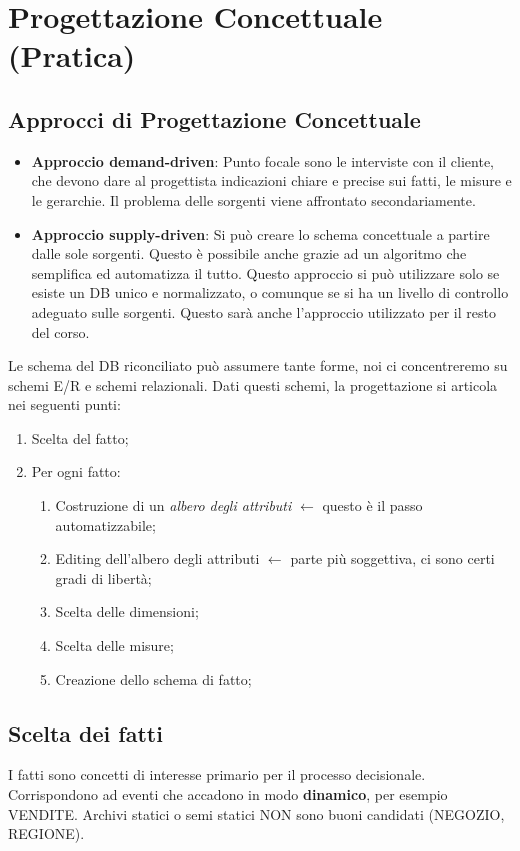 \section{Progettazione Concettuale (Pratica)}
\subsection{Approcci di Progettazione Concettuale}
\begin{itemize}
	\item \textbf{Approccio demand-driven}: Punto focale sono le interviste con il cliente, che devono dare al progettista indicazioni chiare e precise sui fatti, le misure e le gerarchie. Il problema delle sorgenti viene affrontato secondariamente.
	\item \textbf{Approccio supply-driven}: Si può creare lo schema concettuale a partire dalle sole sorgenti. Questo è possibile anche grazie ad un algoritmo che semplifica ed automatizza il tutto. Questo approccio si può utilizzare solo se esiste un DB unico e normalizzato, o comunque se si ha un livello di controllo adeguato sulle sorgenti. Questo sarà anche l'approccio utilizzato per il resto del corso.
\end{itemize}
Le schema del DB riconciliato può assumere tante forme, noi ci concentreremo su schemi E/R e schemi relazionali. Dati questi schemi, la progettazione si articola nei seguenti punti:
\begin{enumerate}
	\item Scelta del fatto;
	\item Per ogni fatto:
	\begin{enumerate}
		\item Costruzione di un \textit{albero degli attributi} $\xleftarrow{}$ questo è il passo automatizzabile;
		\item Editing dell'albero degli attributi $\xleftarrow{}$ parte più soggettiva, ci sono certi gradi di libertà;
		\item Scelta delle dimensioni;
		\item Scelta delle misure;
		\item Creazione dello schema di fatto;
	\end{enumerate}
\end{enumerate}

\subsection{Scelta dei fatti}
I fatti sono concetti di interesse primario per il processo decisionale. Corrispondono ad eventi che accadono in modo \textbf{dinamico}, per esempio VENDITE. Archivi statici o semi statici NON sono buoni candidati (NEGOZIO, REGIONE).

